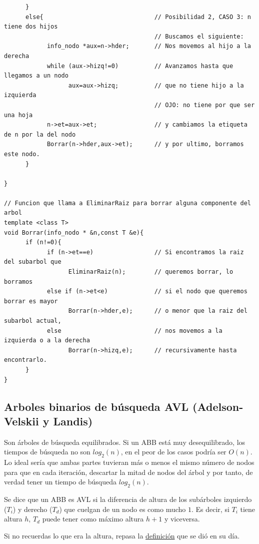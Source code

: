 \documentclass[10pt,a4paper,spanish]{report}
\begin{document}
\begin{verbatim}
      }
      else{                               // Posibilidad 2, CASO 3: n tiene dos hijos
                                          // Buscamos el siguiente: 
            info_nodo *aux=n->hder;       // Nos movemos al hijo a la derecha
            while (aux->hizq!=0)          // Avanzamos hasta que llegamos a un nodo
                  aux=aux->hizq;          // que no tiene hijo a la izquierda
                                          // OJO: no tiene por que ser una hoja
            n->et=aux->et;                // y cambiamos la etiqueta de n por la del nodo
            Borrar(n->hder,aux->et);      // y por ultimo, borramos este nodo.
      }
        
}

// Funcion que llama a EliminarRaiz para borrar alguna componente del arbol
template <class T>
void Borrar(info_nodo * &n,const T &e){
      if (n!=0){
            if (n->et==e)                 // Si encontramos la raiz del subarbol que
                  EliminarRaiz(n);        // queremos borrar, lo borramos
            else if (n->et<e)             // si el nodo que queremos borrar es mayor
                  Borrar(n->hder,e);      // o menor que la raiz del subarbol actual,
            else                          // nos movemos a la izquierda o a la derecha
                  Borrar(n->hizq,e);      // recursivamente hasta encontrarlo.
      }
}
\end{verbatim}

\subsection{\textcolor[rgb]{0.3,0.4,0.8}Arboles binarios de búsqueda AVL (Adelson-Velskii y Landis)}
\noindent
Son árboles de búsqueda equilibrados. Si un ABB está muy desequilibrado, los tiempos de búsqueda no son $log_2 (n)$, en el peor de los casos podría ser $O(n)$.
Lo ideal sería que ambas partes tuvieran más o menos el mismo número de nodos para que en cada iteración, descartar la mitad de nodos del árbol y por tanto, 
de verdad tener un tiempo de búsqueda $log_2 (n)$.

\noindent
Se dice que un ABB es AVL si la diferencia de altura de los subárboles izquierdo ($T_i$) y derecho ($T_d$) que cuelgan de un nodo es como mucho $1$. Es decir, si $T_i$ tiene altura $h$, $T_d$ puede tener como máximo altura $h+1$ y viceversa.

\noindent
Si no recuerdas lo que era la altura, repasa la \hyperref[def_altura]{definición} que se dió en su día.
\end{document}
